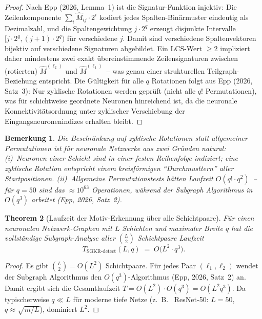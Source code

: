 ﻿\documentclass[12pt, a4paper, openany]{report}
\newtheorem{theorem}{Theorem}[chapter]
\newtheorem{remark}[theorem]{Bemerkung}
\begin{document}
\begin{proof}
Nach Epp (2026, Lemma~1) ist die Signatur-Funktion injektiv: Die
Zeilenkomponente $\sum_{i} \hat{M}_{ij} \cdot 2^i$ kodiert jedes
Spalten-Binärmuster eindeutig als Dezimalzahl, und die Spaltengewichtung
$j \cdot 2^q$ erzeugt disjunkte Intervalle $[j\cdot 2^q, (j+1)\cdot 2^q)$
für verschiedene $j$.  Damit sind verschiedene Spalten\-vektoren
bijektiv auf verschiedene Signaturen abgebildet.  Ein
LCS-Wert $\geq 2$ impliziert daher mindestens zwei exakt übereinstimmende
Zeilen\-signaturen zwischen (rotierten) $\hat{M}^{(\ell_2)}$ und
$\hat{M}^{(\ell_1)}$~-- was genau einer strukturellen Teilgraph-Beziehung
entspricht.  Die Gültigkeit für alle $q$ Rotationen folgt aus Epp (2026,
Satz~3): Nur zyklische Rotationen werden geprüft (nicht alle $q!$
Permutationen), was für schichtweise geordnete Neuronen hinreichend ist,
da die neuronale Konnektivitätsordnung unter zyklischer Verschiebung
der Ein\-gangs\-neuronen\-indizes erhalten bleibt.
\end{proof}

\begin{remark}
Die Beschränkung auf zyklische Rotationen statt allgemeiner Permutationen
ist für neuronale Netzwerke aus zwei Gründen natural: (i)~Neuronen
einer Schicht sind in einer festen Reihenfolge indiziert; eine zyklische
Rotation entspricht einem kreisförmigen ``Durchmusttern'' aller
Startpositionen.  (ii)~Allgemeine Permutationstests hätten Laufzeit
$O(q! \cdot q^2)$~-- für $q = 50$ sind das $\approx 10^{63}$ Operationen,
während der Subgraph Algorithmus in $O(q^3)$ arbeitet
(Epp, 2026, Satz~2).
\end{remark}

\begin{theorem}[Laufzeit der Motiv-Erkennung über alle Schichtpaare]
\label{thm:motif_runtime}
Für einen neuronalen Netzwerk-Graphen mit $L$ Schichten und maximaler
Breite $q$ hat die vollständige Subgraph-Analyse aller $\binom{L}{2}$
Schicht\-paare Laufzeit
\begin{equation}
  \label{eq:motif_runtime}
  T_{\mathrm{SGKR\text{-}detect}}(L, q)
  \;=\; O\!\bigl(L^2 \cdot q^3\bigr).
\end{equation}
\end{theorem}

\begin{proof}
Es gibt $\binom{L}{2} = O(L^2)$ Schichtpaare.  Für jedes Paar
$(\ell_1, \ell_2)$ wendet der Subgraph Algorithmus den
$O(q^3)$-Algorithmus (Epp, 2026, Satz~2) an.  Damit ergibt sich die
Gesamtlaufzeit $T = O(L^2) \cdot O(q^3) = O(L^2 q^3)$.  Da
typischerweise $q \ll L$ für moderne tiefe Netze (z.~B.~ ResNet-50:
$L = 50$, $q \approx \sqrt{m/L}$), dominiert $L^2$.
\end{proof}
\end{document}
